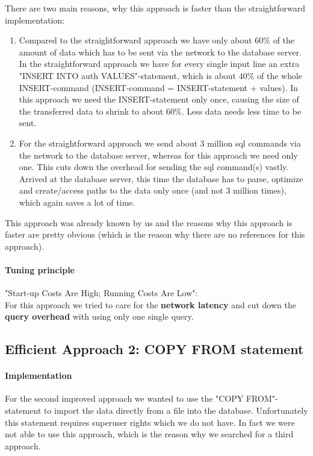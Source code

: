 \documentclass[11pt]{scrartcl}
\begin{document}
  There are two main reasons, why this approach is faster than the straightforward implementation:
  \begin{enumerate}
  	\item Compared to the straightforward approach we have only about 60\% of the amount of data which has to be sent via the network to the database server. In the straightforward approach we have for every single input line an extra "INSERT INTO auth VALUES"-statement, which is about 40\% of the whole INSERT-command (INSERT-command = INSERT-statement + values). In this approach we need the INSERT-statement only once, causing the size of the transferred data to shrink to about 60\%. Less data needs less time to be sent.
    \item For the straightforward approach we send about 3 million sql commands via the network to the database server, whereas for this approach we need only one. This cuts down the overhead for sending the sql command(s) vastly. Arrived at the database server, this time the database has to parse, optimize and create/access paths to the data only once (and not 3 million times), which again saves a lot of time.
  \end{enumerate}
This approach was already known by us and the reasons why this approach is faster are pretty obvious (which is the reason why there are no references for this approach).

  \paragraph{Tuning principle}

  "Start-up Costs Are High; Running Costs Are Low":
  \\
  For this approach we tried to care for the \textbf{network latency} and cut down the \textbf{query overhead} with using only one single query.

  \subsection*{Efficient Approach 2: COPY FROM statement}

\paragraph{Implementation}

For the second improved approach we wanted to use the "COPY FROM"-statement to import the data directly from a file into the database. Unfortunately this statement requires superuser rights which we do not have. In fact we were not able to use this approach, which is the reason why we searched for a third approach.
\end{document}

